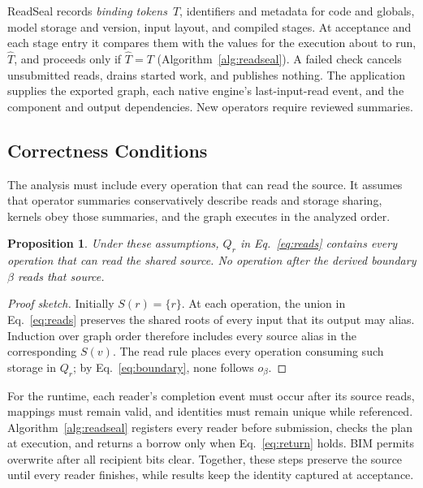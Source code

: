 \documentclass[conference]{IEEEtran}
\newtheorem{proposition}{Proposition}
\begin{document}
ReadSeal records \emph{binding tokens}~$T$, identifiers and metadata for code and globals, model storage and version, input layout, and compiled stages. At acceptance and each stage entry it compares them with the values for the execution about to run, $\hat T$, and proceeds only if $\hat T=T$ (Algorithm~\ref{alg:readseal}). A failed check cancels unsubmitted reads, drains started work, and publishes nothing. The application supplies the exported graph, each native engine's last-input-read event, and the component and output dependencies. New operators require reviewed summaries.

\subsection{Correctness Conditions}
\label{sec:correctness}

The analysis must include every operation that can read the source. It assumes that operator summaries conservatively describe reads and storage sharing, kernels obey those summaries, and the graph executes in the analyzed order.

\begin{proposition}
Under these assumptions, $Q_r$ in Eq.~\eqref{eq:reads} contains every operation that can read the shared source. No operation after the derived boundary $\beta$ reads that source.
\end{proposition}

\begin{proof}[Proof sketch]
Initially $S(r)=\{r\}$. At each operation, the union in Eq.~\eqref{eq:reads} preserves the shared roots of every input that its output may alias. Induction over graph order therefore includes every source alias in the corresponding $S(v)$. The read rule places every operation consuming such storage in $Q_r$; by Eq.~\eqref{eq:boundary}, none follows $o_\beta$.
\end{proof}

For the runtime, each reader's completion event must occur after its source reads, mappings must remain valid, and identities must remain unique while referenced. Algorithm~\ref{alg:readseal} registers every reader before submission, checks the plan at execution, and returns a borrow only when Eq.~\eqref{eq:return} holds. BIM permits overwrite after all recipient bits clear. Together, these steps preserve the source until every reader finishes, while results keep the identity captured at acceptance.

\end{document}
